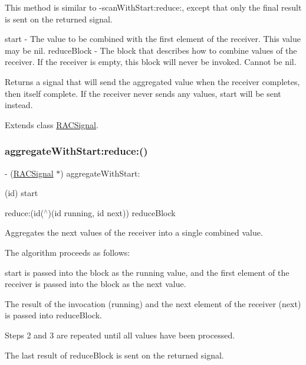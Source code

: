 This method is similar to -\/scan\+With\+Start\+:reduce\+:, except that only the final result is sent on the returned signal.

start -\/ The value to be combined with the first element of the receiver. This value may be {\ttfamily nil}. reduce\+Block -\/ The block that describes how to combine values of the receiver. If the receiver is empty, this block will never be invoked. Cannot be nil.

Returns a signal that will send the aggregated value when the receiver completes, then itself complete. If the receiver never sends any values, {\ttfamily start} will be sent instead. 

Extends class \mbox{\hyperlink{interface_r_a_c_signal_a4b872b6c2322aa37f98282043e768582}{R\+A\+C\+Signal}}.

\mbox{\label{category_r_a_c_signal_07_operations_08_a4b872b6c2322aa37f98282043e768582}} 
\subsubsection{\texorpdfstring{aggregate\+With\+Start\+:reduce\+:()}{aggregateWithStart:reduce:()}\hspace{0.1cm}{\footnotesize\ttfamily [3/3]}}
{\footnotesize\ttfamily -\/ (\mbox{\hyperlink{interface_r_a_c_signal}{R\+A\+C\+Signal}} $\ast$) aggregate\+With\+Start\+: \begin{DoxyParamCaption}\item[{(id)}]{start }\item[{reduce:(id($^\wedge$)(id running, id next))}]{reduce\+Block }\end{DoxyParamCaption}}

Aggregates the {\ttfamily next} values of the receiver into a single combined value.

The algorithm proceeds as follows\+:


\begin{DoxyEnumerate}
\item {\ttfamily start} is passed into the block as the {\ttfamily running} value, and the first element of the receiver is passed into the block as the {\ttfamily next} value.
\item The result of the invocation ({\ttfamily running}) and the next element of the receiver ({\ttfamily next}) is passed into {\ttfamily reduce\+Block}.
\item Steps 2 and 3 are repeated until all values have been processed.
\item The last result of {\ttfamily reduce\+Block} is sent on the returned signal.
\end{DoxyEnumerate}

